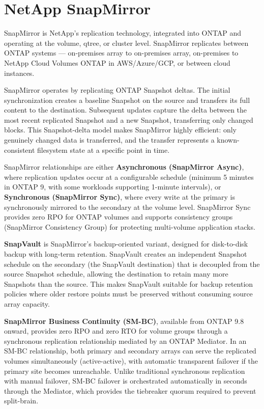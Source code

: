 \section{NetApp SnapMirror}
SnapMirror is NetApp's replication technology, integrated into ONTAP and operating at the volume, qtree, or cluster level. SnapMirror replicates between ONTAP systems --- on-premises array to on-premises array, on-premises to NetApp Cloud Volumes ONTAP in AWS/Azure/GCP, or between cloud instances.

SnapMirror operates by replicating ONTAP Snapshot deltas. The initial synchronization creates a baseline Snapshot on the source and transfers its full content to the destination. Subsequent updates capture the delta between the most recent replicated Snapshot and a new Snapshot, transferring only changed blocks. This Snapshot-delta model makes SnapMirror highly efficient: only genuinely changed data is transferred, and the transfer represents a known-consistent filesystem state at a specific point in time.

SnapMirror relationships are either \textbf{Asynchronous (SnapMirror Async)}, where replication updates occur at a configurable schedule (minimum 5 minutes in ONTAP 9, with some workloads supporting 1-minute intervals), or \textbf{Synchronous (SnapMirror Sync)}, where every write at the primary is synchronously mirrored to the secondary at the volume level. SnapMirror Sync provides zero RPO for ONTAP volumes and supports consistency groups (SnapMirror Consistency Group) for protecting multi-volume application stacks.

\textbf{SnapVault} is SnapMirror's backup-oriented variant, designed for disk-to-disk backup with long-term retention. SnapVault creates an independent Snapshot schedule on the secondary (the SnapVault destination) that is decoupled from the source Snapshot schedule, allowing the destination to retain many more Snapshots than the source. This makes SnapVault suitable for backup retention policies where older restore points must be preserved without consuming source array capacity.

\textbf{SnapMirror Business Continuity (SM-BC)}, available from ONTAP 9.8 onward, provides zero RPO and zero RTO for volume groups through a synchronous replication relationship mediated by an ONTAP Mediator. In an SM-BC relationship, both primary and secondary arrays can serve the replicated volumes simultaneously (active-active), with automatic transparent failover if the primary site becomes unreachable. Unlike traditional synchronous replication with manual failover, SM-BC failover is orchestrated automatically in seconds through the Mediator, which provides the tiebreaker quorum required to prevent split-brain.

